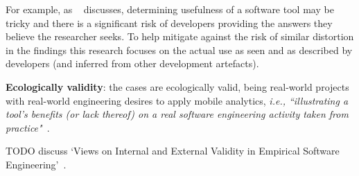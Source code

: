 For example, as ~\citealt[pp.132-133]{Ko2015_a_practical_guide_to_controlled_experiments_of_sw_eng_tools_with_human_participants} discusses, determining usefulness of a software tool may be tricky and there is a significant risk of developers providing the answers they believe the researcher seeks. To help mitigate against the risk of similar distortion in the findings this research focuses on the actual use as seen and as described by developers (and inferred from other development artefacts).


\textbf{Ecologically validity}: the cases are ecologically valid, being real-world projects with real-world engineering desires to apply mobile analytics, \emph{i.e., ``illustrating a tool’s benefits (or lack thereof) on a real software engineering activity taken from practice"}~\citep[p.126]{Ko2015_a_practical_guide_to_controlled_experiments_of_sw_eng_tools_with_human_participants}.

TODO discuss `Views on Internal and External Validity in Empirical Software Engineering'~\citep{sigmund2015_views_on_internal_and_external_validity_in_ESE}.
